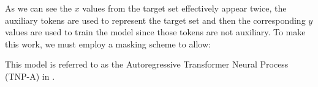 \documentclass[../../main.tex]{subfiles}
\begin{document}
As we can see the $x$ values from the target set effectively appear twice, the auxiliary tokens are used to represent the target set and then the corresponding $y$ values are used to train the model since those tokens are not auxiliary. To make this work, we must employ a masking scheme to allow:


This model is referred to as the Autoregressive Transformer Neural Process (TNP-A) in \cite{nguyen2023transformer}.

\ifSubfilesClassLoaded{%
    \printbibliography{}
}{} 
\end{document}
